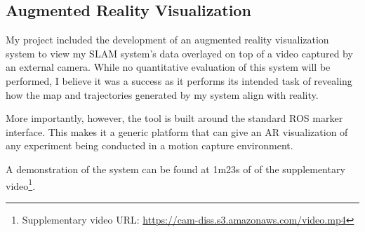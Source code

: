 \subsection{Augmented Reality Visualization}
\label{sec:augmented-reality-visualization-eval}
My project included the development of an augmented reality visualization system to view my SLAM system's data overlayed on top of a video captured by an external camera. While no quantitative evaluation of this system will be performed, I believe it was a success as it performs its intended task of revealing how the map and trajectories generated by my system align with reality.

More importantly, however, the tool is built around the standard ROS marker interface. This makes it a generic platform that can give an AR visualization of any experiment being conducted in a motion capture environment.

A demonstration of the system can be found at 1m23s of  of the supplementary video\footnote[1]{Supplementary video URL: \url{https://cam-diss.s3.amazonaws.com/video.mp4}}.